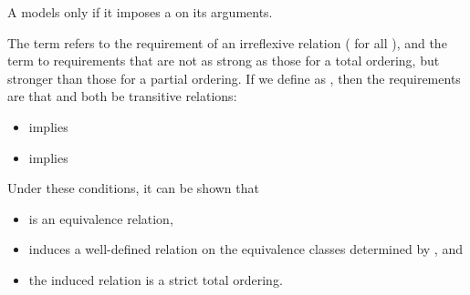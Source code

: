 \begin{itemdescr}
\pnum
A  models  only if
it imposes a  on its arguments.

\pnum
The term
refers to the
requirement of an irreflexive relation ( for all ),
and the term
to requirements that are not as strong as
those for a total ordering,
but stronger than those for a partial
ordering.
If we define
as
,
then the requirements are that
and
both be transitive relations:

\begin{itemize}
\item
{}
implies
\item
{}
implies
\end{itemize}

\pnum
\begin{note}
Under these conditions, it can be shown that
\begin{itemize}
\item
{}
is an equivalence relation,
\item
{}
induces a well-defined relation on the equivalence
classes determined by
, and
\item
the induced relation is a strict total ordering.
\end{itemize}
\end{note}
\end{itemdescr}
